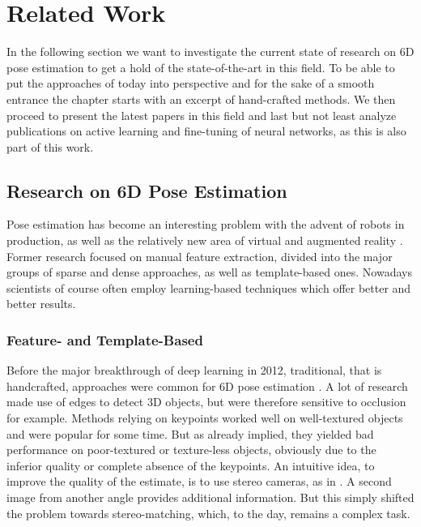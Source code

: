 \chapter{Related Work}

In the following section we want to investigate the current state of research on 6D pose estimation to get a hold of the state-of-the-art in this field. To be able to put the approaches of today into perspective and for the sake of a smooth entrance the chapter starts with an excerpt of hand-crafted methods. We then proceed to present the latest papers in this field and last but not least analyze publications on active learning and fine-tuning of neural networks, as this is also part of this work.

\section{Research on 6D Pose Estimation}

Pose estimation has become an interesting problem with the advent of robots in production, as well as the relatively new area of virtual and augmented reality \cite{bb8}. Former research focused on manual feature extraction, divided into the major groups of sparse and dense approaches, as well as template-based ones. Nowadays scientists of course often employ learning-based techniques which offer better and better results.

\subsection{Feature- and Template-Based}

Before the major breakthrough of deep learning in 2012, traditional, that is handcrafted, approaches were common for 6D pose estimation \cite{ylecun}. A lot of research \cite{gklein,dglowe2,charris} made use of edges to detect 3D objects, but were therefore sensitive to occlusion for example. Methods relying on keypoints \cite{dglowe1, dwagner} worked well on well-textured objects and were popular for some time. But as already implied, they yielded bad performance on poor-textured or texture-less objects, obviously due to the inferior quality or complete absence of the keypoints. An intuitive idea, to improve the quality of the estimate, is to use stereo cameras, as in \cite{kpauwels}. A second image from another angle provides additional information. But this simply shifted the problem towards stereo-matching, which, to the day, remains a complex task. 

